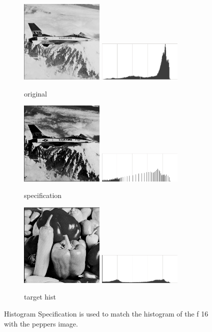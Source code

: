 \documentclass[letterpaper,10pt]{article}
\begin{document}
\begin{figure}[hbtp]
  \centering
  \begin{subfigure}{4cm}
    \includegraphics[width=4cm]{images/f_16.png}
    \includegraphics[width=4cm]{images/f_16_hist.png}
    \caption{original}
  \end{subfigure}
  \begin{subfigure}{4cm}
    \includegraphics[width=4cm]{images/f_16_specification.png}
    \includegraphics[width=4cm]{images/f_16_specification_hist.png}
    \caption{specification}
  \end{subfigure}
  \begin{subfigure}{4cm}
    \includegraphics[width=4cm]{images/peppers.png}
    \includegraphics[width=4cm]{images/peppers_hist.png}
    \caption{target hist}
  \end{subfigure}
  \caption{Histogram Specification is used to match the histogram of the f 16 with the peppers image.}
  \label{fig:specificationf}
\end{figure}
\end{document}
